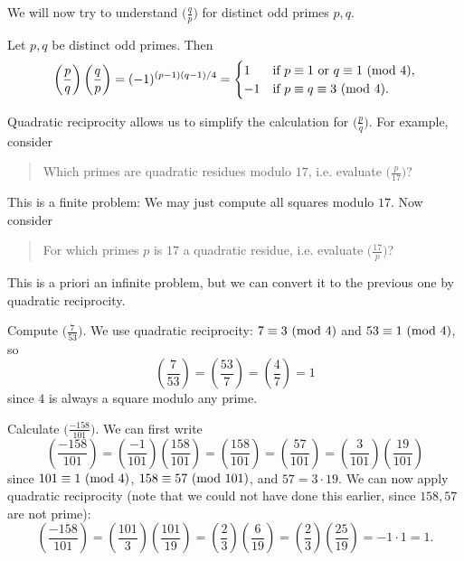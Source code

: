 \begin{remark}
  We will now try to understand
  $\big(\frac{q}{p}\big)$ for distinct
  odd primes $p, q$.
\end{remark}

\begin{theorem}
  Let $p, q$ be distinct odd primes. Then
  \[
    \left(\frac{p}{q}\right)
    \left(\frac{q}{p}\right)
    = (-1)^{(p - 1)(q - 1) / 4}
    =
    \begin{cases}
      1 & \text{if } p \equiv 1 \text{ or } q \equiv 1 \ (\mathrm{mod}\ 4), \\
      -1 & \text{if } p \equiv q \equiv 3 \ (\mathrm{mod}\ 4).
    \end{cases}
  \]
\end{theorem}

\begin{remark}
  Quadratic reciprocity allows us to
  simplify the calculation for
  $\big(\frac{p}{q}\big)$.
  For example, consider
  \begin{quote}
    Which primes are quadratic residues modulo
    $17$, i.e. evaluate $\big(\frac{p}{17}\big)$?
  \end{quote}
  This is a finite problem: We may just
  compute all squares modulo $17$.
  Now consider
  \begin{quote}
    For which primes $p$ is $17$ a
    quadratic residue, i.e. evaluate
    $\big(\frac{17}{p}\big)$?
  \end{quote}
  This is a priori an infinite problem,
  but we can convert it to the previous one
  by quadratic reciprocity.
\end{remark}

\begin{example}
  Compute $\big(\frac{7}{53}\big)$.
  We use quadratic reciprocity:
  $7 \equiv 3 \ (\mathrm{mod}\ 4)$ and
  $53 \equiv 1 \ (\mathrm{mod}\ 4)$, so
  \[
    \left(\frac{7}{53}\right)
    =
    \left(\frac{53}{7}\right)
    =
    \left(\frac{4}{7}\right)
    = 1
  \]
  since $4$ is always a square modulo any
  prime.
\end{example}

\begin{example}
  Calculate $\big(\frac{-158}{101}\big)$.
  We can first write
  \[
    \left(\frac{-158}{101}\right)
    = \left(\frac{-1}{101}\right)
    \left(\frac{158}{101}\right)
    = \left(\frac{158}{101}\right)
    = \left(\frac{57}{101}\right)
    = \left(\frac{3}{101}\right)
    \left(\frac{19}{101}\right)
  \]
  since $101 \equiv 1 \ (\mathrm{mod}\ 4)$,
  $158 \equiv 57 \ (\mathrm{mod}\ 101)$, and
  $57 = 3 \cdot 19$. We can now
  apply quadratic reciprocity (note that
  we could not have done this earlier,
  since $158, 57$ are not prime):
  \[
    \left(\frac{-158}{101}\right)
    = \left(\frac{101}{3}\right)
    \left(\frac{101}{19}\right)
    = \left(\frac{2}{3}\right)
    \left(\frac{6}{19}\right)
    = \left(\frac{2}{3}\right)\left(\frac{25}{19}\right)
    = -1 \cdot 1 = 1.
  \]
\end{example}

